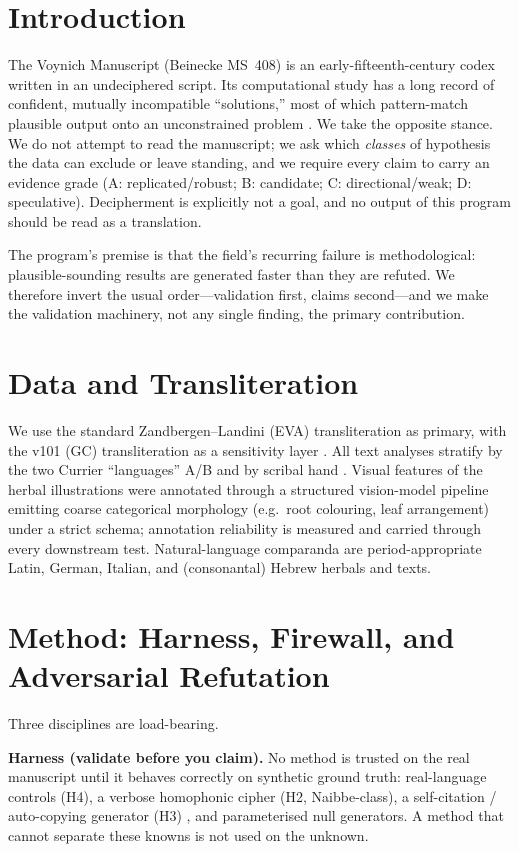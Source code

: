 \documentclass[11pt]{article}
\begin{document}
\section{Introduction}
The Voynich Manuscript (Beinecke MS~408) is an early-fifteenth-century codex written
in an undeciphered script. Its computational study has a long record of confident,
mutually incompatible ``solutions,'' most of which pattern-match plausible output onto
an unconstrained problem \citep{reddy2011know,bowern2021linguistics}. We take the
opposite stance. We do not attempt to read the manuscript; we ask which \emph{classes}
of hypothesis the data can exclude or leave standing, and we require every claim to
carry an evidence grade (A: replicated/robust; B: candidate; C: directional/weak; D:
speculative). Decipherment is explicitly not a goal, and no output of this program
should be read as a translation.

The program's premise is that the field's recurring failure is methodological:
plausible-sounding results are generated faster than they are refuted. We therefore
invert the usual order---validation first, claims second---and we make the validation
machinery, not any single finding, the primary contribution.

\section{Data and Transliteration}
We use the standard Zandbergen--Landini (EVA) transliteration as primary, with the
v101 (GC) transliteration as a sensitivity layer \citep{zandbergen_voynichnu}. All
text analyses stratify by the two Currier ``languages'' A/B \citep{currier1976} and by
scribal hand \citep{fagindavis2020hands}. Visual features of the herbal illustrations
were annotated through a structured vision-model pipeline emitting coarse categorical
morphology (e.g.\ root colouring, leaf arrangement) under a strict schema; annotation
reliability is measured and carried through every downstream test. Natural-language
comparanda are period-appropriate Latin, German, Italian, and (consonantal) Hebrew
herbals and texts.

\section{Method: Harness, Firewall, and Adversarial Refutation}
Three disciplines are load-bearing.

\textbf{Harness (validate before you claim).} No method is trusted on the real
manuscript until it behaves correctly on synthetic ground truth: real-language
controls (H4), a verbose homophonic cipher (H2, Naibbe-class), a self-citation /
auto-copying generator (H3) \citep{timm2020selfcitation}, and parameterised null
generators. A method that cannot separate these knowns is not used on the unknown.
\end{document}
